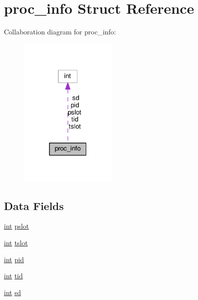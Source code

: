 \hypertarget{structproc__info}{}\section{proc\+\_\+info Struct Reference}
\label{structproc__info}


Collaboration diagram for proc\+\_\+info\+:
\nopagebreak
\begin{figure}[H]
\begin{center}
\leavevmode
\includegraphics[width=136pt]{structproc__info__coll__graph}
\end{center}
\end{figure}
\subsection*{Data Fields}
\begin{DoxyCompactItemize}
\item 
\hyperlink{pcre_8txt_a42dfa4ff673c82d8efe7144098fbc198}{int} \hyperlink{structproc__info_a83750751392fb11f5d959197dcec4361}{pslot}
\item 
\hyperlink{pcre_8txt_a42dfa4ff673c82d8efe7144098fbc198}{int} \hyperlink{structproc__info_a2093cd5fe4ff4b2a733ba51e651be150}{tslot}
\item 
\hyperlink{pcre_8txt_a42dfa4ff673c82d8efe7144098fbc198}{int} \hyperlink{structproc__info_a50c0df08d65cb6824cf3aa3379af2e63}{pid}
\item 
\hyperlink{pcre_8txt_a42dfa4ff673c82d8efe7144098fbc198}{int} \hyperlink{structproc__info_aa1467e93e56d40296f1b036cd72c37d3}{tid}
\item 
\hyperlink{pcre_8txt_a42dfa4ff673c82d8efe7144098fbc198}{int} \hyperlink{structproc__info_a264c12ac7361f212570e51c91025b9b5}{sd}
\end{DoxyCompactItemize}


